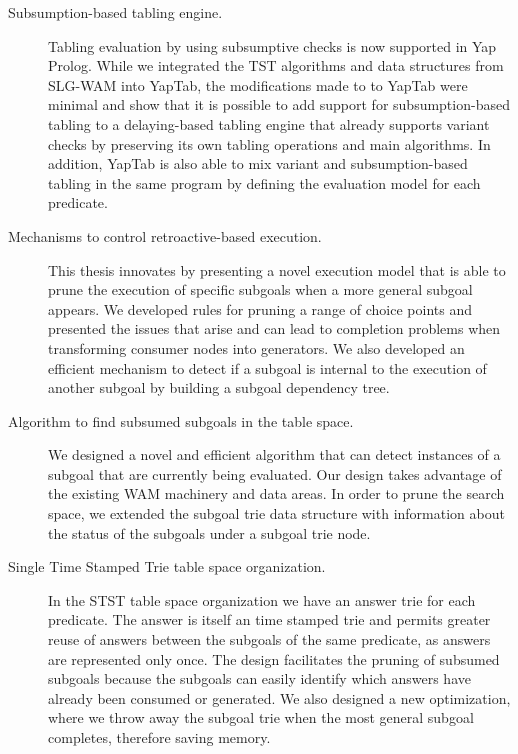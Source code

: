 \begin{description}
   \item[Subsumption-based tabling engine.] Tabling evaluation by using subsumptive checks is now supported in Yap Prolog.
   While we integrated the TST algorithms and data structures from SLG-WAM into YapTab, the modifications made to
   to YapTab were minimal and show that it is possible to add support for subsumption-based tabling to a delaying-based
   tabling engine that already supports variant checks by preserving its own tabling operations and main algorithms.
   In addition, YapTab is also able to mix variant and subsumption-based tabling in the same program by defining
   the evaluation model for each predicate.
   
   \item[Mechanisms to control retroactive-based execution.] This thesis innovates by presenting a novel execution model
   that is able to prune the execution of specific subgoals when a more general subgoal appears. We developed rules
   for pruning a range of choice points and presented the issues that arise and can lead to completion problems when
   transforming consumer nodes into generators. We also developed an efficient mechanism to detect if a subgoal is
   internal to the execution of another subgoal by building a subgoal dependency tree.
   
   \item[Algorithm to find subsumed subgoals in the table space.] We designed a novel and efficient algorithm that
   can detect instances of a subgoal that are currently being evaluated. Our design takes advantage of the existing
   WAM machinery and data areas. In order to prune the search space, we extended the subgoal trie data structure with
   information about the status of the subgoals under a subgoal trie node.
   
   \item[Single Time Stamped Trie table space organization.] In the STST table space organization we have an answer
   trie for each predicate. The answer is itself an time stamped trie and permits greater reuse of answers between
   the subgoals of the same predicate, as answers are represented only once. The design facilitates the pruning of
   subsumed subgoals because the subgoals can easily identify which answers have already been consumed or generated.
   We also designed a new optimization, where we throw away the subgoal trie when the most general subgoal completes,
   therefore saving memory.
   

\end{description}
